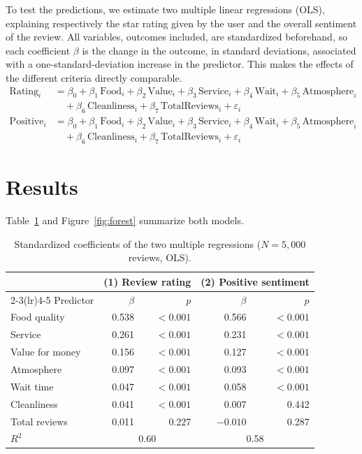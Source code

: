 \documentclass[11pt,a4paper]{article}
\begin{document}
To test the predictions, we estimate two multiple linear regressions (OLS),
explaining respectively the star rating given by the user and the overall
sentiment of the review. All variables, outcomes included, are standardized
beforehand, so each coefficient $\beta$ is the change in the outcome, in
standard deviations, associated with a one-standard-deviation increase in the
predictor. This makes the effects of the different criteria directly
comparable.
\begin{align}
\text{Rating}_i &= \beta_0 + \beta_1\,\text{Food}_i + \beta_2\,\text{Value}_i
  + \beta_3\,\text{Service}_i + \beta_4\,\text{Wait}_i
  + \beta_5\,\text{Atmosphere}_i \nonumber\\
  &\quad + \beta_6\,\text{Cleanliness}_i + \beta_7\,\text{TotalReviews}_i
  + \varepsilon_i \\[4pt]
\text{Positive}_i &= \beta_0 + \beta_1\,\text{Food}_i + \beta_2\,\text{Value}_i
  + \beta_3\,\text{Service}_i + \beta_4\,\text{Wait}_i
  + \beta_5\,\text{Atmosphere}_i \nonumber\\
  &\quad + \beta_6\,\text{Cleanliness}_i + \beta_7\,\text{TotalReviews}_i
  + \varepsilon_i
\end{align}

\section{Results}

Table~\ref{tab:results} and Figure~\ref{fig:forest} summarize both models.

\begin{table}[h]
  \centering
  \small
  \begin{tabular}{lrrrr}
    \toprule
    & \multicolumn{2}{c}{(1) Review rating} & \multicolumn{2}{c}{(2) Positive sentiment} \\
    \cmidrule(lr){2-3}\cmidrule(lr){4-5}
    Predictor & $\beta$ & $p$ & $\beta$ & $p$ \\
    \midrule
    Food quality      & 0.538 & $<0.001$ & 0.566 & $<0.001$ \\
    Service           & 0.261 & $<0.001$ & 0.231 & $<0.001$ \\
    Value for money   & 0.156 & $<0.001$ & 0.127 & $<0.001$ \\
    Atmosphere        & 0.097 & $<0.001$ & 0.093 & $<0.001$ \\
    Wait time         & 0.047 & $<0.001$ & 0.058 & $<0.001$ \\
    Cleanliness       & 0.041 & $<0.001$ & 0.007 & 0.442 \\
    Total reviews     & 0.011 & 0.227    & $-0.010$ & 0.287 \\
    \midrule
    $R^2$             & \multicolumn{2}{c}{0.60} & \multicolumn{2}{c}{0.58} \\
    \bottomrule
  \end{tabular}
  \caption{Standardized coefficients of the two multiple regressions
  ($N = 5{,}000$ reviews, OLS).}
  \label{tab:results}
\end{table}
\end{document}
